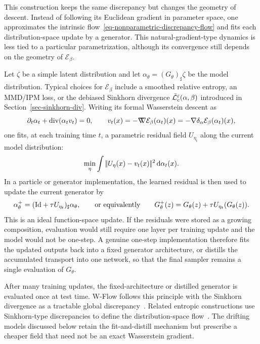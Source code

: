 This construction keeps the same discrepancy but changes the geometry of descent. Instead of following its Euclidean gradient in parameter space, one approximates the intrinsic flow~\eqref{eq-nonparametric-discrepancy-flow} and fits each distribution-space update by a generator. This natural-gradient-type dynamics is less tied to a particular parametrization, although its convergence still depends on the geometry of $\mathcal E_\beta$.

Let $\zeta$ be a simple latent distribution and let $\alpha_\theta=(G_\theta)_\sharp\zeta$ be the model distribution. Typical choices for $\mathcal E_\beta$ include a smoothed relative entropy, an MMD/IPM loss, or the debiased Sinkhorn divergence $\bar{\mathcal{L}}_c^\varepsilon(\alpha,\beta)$ introduced in Section~\ref{sec-sinkhorn-div}. Writing its formal Wasserstein descent as
\begin{equation}\label{eq-one-step-wgf}
	\partial_t\alpha_t+\operatorname{div}(\alpha_t v_t)=0,
	\qquad
	v_t(x)=-\mathord{\nabla\mkern-9.3mu\nabla}\mathcal E_\beta(\alpha_t)(x)
	=-\nabla\delta_\alpha \mathcal E_\beta(\alpha_t)(x),
\end{equation}
one fits, at each training time $t$, a parametric residual field $U_{\eta_t}$ along the current model distribution:
\begin{equation}\label{eq-one-step-l2-fit}
	\min_\eta \int
		|\!| U_\eta(x)-v_t(x) |\!|^2
		\,\mathrm{d}\alpha_t(x).
\end{equation}
In a particle or generator implementation, the learned residual is then used to update the current generator by
\[
	\alpha_{\theta}^{+}
	=
	(\mathrm{Id}+\tau U_{\eta_t})_\sharp \alpha_\theta,
	\qquad\text{or equivalently}\qquad
	G_\theta^{+}(z)=G_\theta(z)+\tau U_{\eta_t}(G_\theta(z)).
\]
This is an ideal function-space update. If the residuals were stored as a growing composition, evaluation would still require one layer per training update and the model would not be one-step. A genuine one-step implementation therefore fits the updated outputs back into a fixed generator architecture, or distills the accumulated transport into one network, so that the final sampler remains a single evaluation of $G_\theta$.


After many training updates, the fixed-architecture or distilled generator is evaluated once at test time. W-Flow follows this principle with the Sinkhorn divergence as a tractable global discrepancy~\cite{Han2026WFlow}. Related entropic constructions use Sinkhorn-type discrepancies to define the distribution-space flow~\cite{He2026SinkhornDrifting}. The drifting models discussed below retain the fit-and-distill mechanism but prescribe a cheaper field that need not be an exact Wasserstein gradient.

